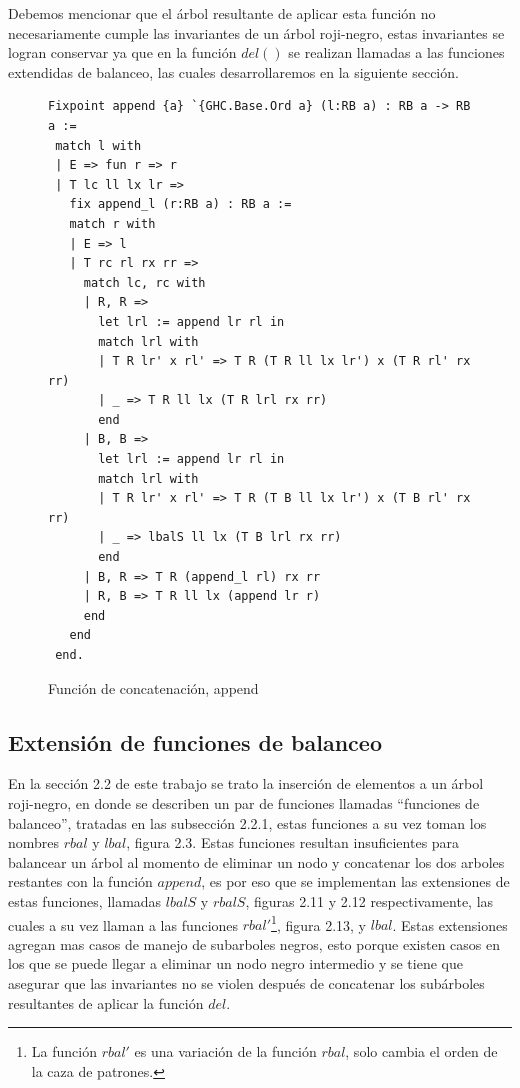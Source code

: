 \documentclass[8pt,leqno,pdflatex,spanish]{book}
\newcommand{\arn}{árbol roji-negro}
\theoremstyle{plain}
\theoremstyle{definition}
\theoremstyle{remark}
\begin{document}
Debemos mencionar que el \'arbol resultante de aplicar esta funci\'on no necesariamente cumple las 
invariantes de un {\arn}, estas invariantes se logran conservar ya que en la funci\'on $del()$ se 
realizan llamadas a las funciones extendidas de balanceo, las cuales desarrollaremos en la 
siguiente sección.

\begin{figure}
\centering 
\captionsetup{justification=centering}
\begin{verbatim}
Fixpoint append {a} `{GHC.Base.Ord a} (l:RB a) : RB a -> RB a :=
 match l with
 | E => fun r => r
 | T lc ll lx lr =>
   fix append_l (r:RB a) : RB a :=
   match r with
   | E => l
   | T rc rl rx rr =>
     match lc, rc with
     | R, R =>
       let lrl := append lr rl in
       match lrl with
       | T R lr' x rl' => T R (T R ll lx lr') x (T R rl' rx rr)
       | _ => T R ll lx (T R lrl rx rr)
       end
     | B, B =>
       let lrl := append lr rl in
       match lrl with
       | T R lr' x rl' => T R (T B ll lx lr') x (T B rl' rx rr)
       | _ => lbalS ll lx (T B lrl rx rr)
       end
     | B, R => T R (append_l rl) rx rr
     | R, B => T R ll lx (append lr r)
     end
   end
 end.
\end{verbatim}
\caption{Funci\'on de concatenaci\'on, append}
\end{figure}

\subsection{Extensi\'on de funciones de balanceo}

En la secci\'on 2.2 de este trabajo se trato la inserci\'on de elementos a un \arn, en donde se 
describen un par de funciones llamadas ``funciones de balanceo'', tratadas en las subsecci\'on 
2.2.1, estas funciones a su vez toman los nombres $rbal$ y $lbal$, figura 2.3. Estas funciones 
resultan insuficientes para balancear un \'arbol al momento de eliminar un nodo y concatenar los 
dos arboles restantes con la función $append$, es por eso que se implementan las extensiones de 
estas funciones, llamadas $lbalS$ y $rbalS$, figuras 2.11 y 2.12 respectivamente, las cuales a su 
vez llaman a las funciones $rbal'$\footnote{La funci\'on $rbal'$ es una variación de la función 
$rbal$, solo cambia el orden de la caza de patrones.}, figura 2.13, y $lbal$. Estas extensiones 
agregan mas casos de manejo de subarboles negros, esto porque existen casos en los que se puede 
llegar a eliminar un nodo negro intermedio y se tiene que asegurar que las invariantes no se 
violen después de concatenar los subárboles resultantes de aplicar la función $del$.
\end{document}
